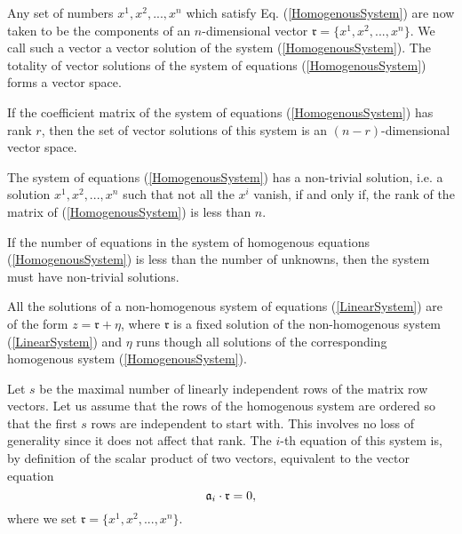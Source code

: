 Any set of numbers $x^1, x^2, ..., x^n$ which satisfy Eq. (\ref{HomogenousSystem}) are now taken to be the components of an $n$-dimensional vector $\mathfrak{r} = \{x^1, x^2, ..., x^n\}$. 
We call such a vector a {\elevenit vector solution} of the system (\ref{HomogenousSystem}). The totality of vector solutions of the system of equations (\ref{HomogenousSystem}) forms a
vector space.

\begin{theorem}
If the coefficient matrix of the system of equations (\ref{HomogenousSystem}) has rank $r$, then the set of vector solutions of this system is an $(n-r)$-dimensional vector space. 
\end{theorem}

\begin{theorem}
The system of equations (\ref{HomogenousSystem}) has a non-trivial solution, i.e. a solution $x^1, x^2, ..., x^n$ such that not all the $x^i$ vanish, if and only if, the rank of the matrix of 
(\ref{HomogenousSystem}) is less than $n$.
\end{theorem}

\begin{theorem}
If the number of equations in the system of homogenous equations (\ref{HomogenousSystem}) is less than the number of unknowns, then the system must have non-trivial solutions. 
\end{theorem}

\begin{theorem}
All the solutions of a non-homogenous system of equations (\ref{LinearSystem}) are of the form $z = \mathfrak{r} + \eta$, where $\mathfrak{r}$ is a fixed solution of the non-homogenous system (\ref{LinearSystem})
and $\eta$ runs though all solutions of the corresponding homogenous system (\ref{HomogenousSystem}). 
\end{theorem}

Let $s$ be the maximal number of linearly independent rows of the matrix row vectors. Let us assume that the rows of the homogenous system are ordered so that the first $s$ rows are independent to 
start with. This involves no loss of generality since it does not affect that rank. The $i$-th equation of this system is, by definition of the scalar product of two vectors, equivalent to the vector equation
$$ \mathfrak{a}_i \cdot \mathfrak{r} = 0,$$ where we set $\mathfrak{r} = \{x^1, x^2, ..., x^n\}$.

